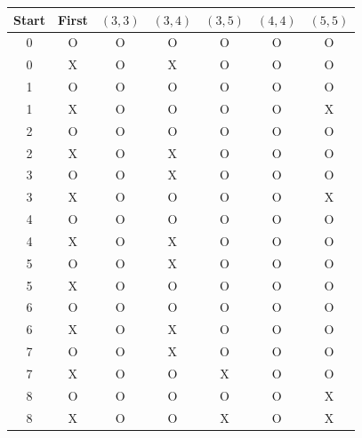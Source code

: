 \begin{tabular}{ccccccc}
\toprule
Start & First & $(3,3)$ & $(3,4)$ & $(3,5)$ & $(4,4)$ & $(5,5)$ \\
\midrule
0 & O & O & O & O & O & O \\
0 & X & O & X & O & O & O \\
1 & O & O & O & O & O & O \\
1 & X & O & O & O & O & X \\
2 & O & O & O & O & O & O \\
2 & X & O & X & O & O & O \\
3 & O & O & X & O & O & O \\
3 & X & O & O & O & O & X \\
4 & O & O & O & O & O & O \\
4 & X & O & X & O & O & O \\
5 & O & O & X & O & O & O \\
5 & X & O & O & O & O & O \\
6 & O & O & O & O & O & O \\
6 & X & O & X & O & O & O \\
7 & O & O & X & O & O & O \\
7 & X & O & O & X & O & O \\
8 & O & O & O & O & O & X \\
8 & X & O & O & X & O & X \\
\bottomrule
\end{tabular}
